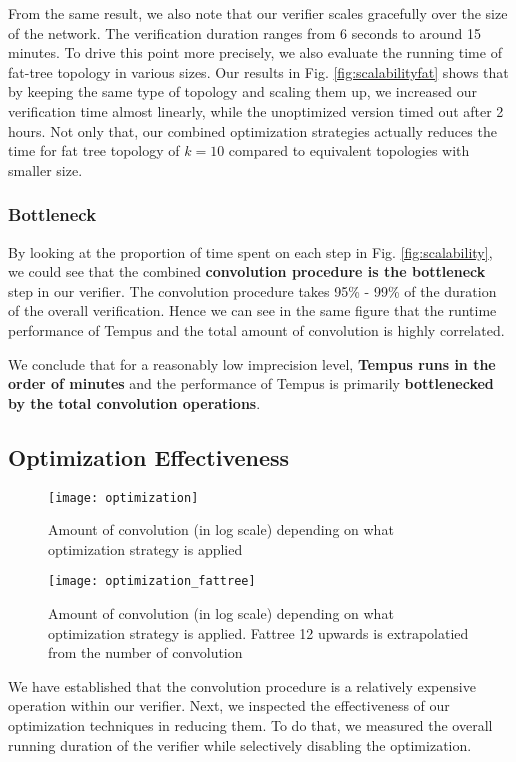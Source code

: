 From the same result, we also note that our verifier scales gracefully over the size of the network.
The verification duration ranges from 6 seconds to around 15 minutes. 
To drive this point more precisely, we also evaluate the running time of fat-tree topology in various sizes.
Our results in Fig. \ref{fig:scalabilityfat} shows that by keeping the same type of topology and scaling them up, we increased 
our verification time almost linearly, while the unoptimized version timed out after 2 hours.
Not only that, our combined optimization strategies actually reduces the time for fat tree topology of $k=10$ compared to 
equivalent topologies with smaller size.

\subsubsection{Bottleneck}
By looking at the proportion of time spent on each step in Fig. \ref{fig:scalability}, we could see that 
the combined \textbf{convolution procedure is the bottleneck} step in our verifier.
The convolution procedure takes 95\% - 99\% of the duration of the overall verification.
Hence we can see in the same figure that the runtime performance of Tempus and the total amount 
of convolution is highly correlated.

We conclude that for a reasonably low imprecision level, \textbf{Tempus runs in the order of 
minutes} and the performance of Tempus is primarily \textbf{bottlenecked by the total convolution 
operations}.

\subsection{Optimization Effectiveness}

\begin{figure}[h]
    \centering
    \texttt{[image: optimization]}
    \caption{Amount of convolution (in log scale) depending on what optimization strategy is applied}
    \label{fig:opt}
\end{figure}
\begin{figure}[h]
    \centering
    \texttt{[image: optimization\_fattree]}
    \caption{Amount of convolution (in log scale) depending on what optimization strategy is applied. 
        Fattree 12 upwards is extrapolatied from the number of convolution}
    \label{fig:opt_fat}
\end{figure}

We have established that the convolution procedure is a relatively expensive operation within 
our verifier.
Next, we inspected the effectiveness of our optimization techniques in reducing them.
To do that, we measured the overall running duration of the verifier while selectively disabling the 
optimization.

